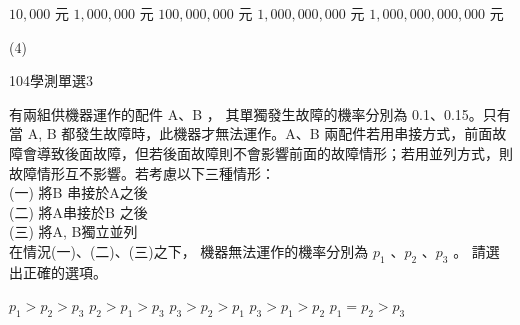 \begin{QUESTIONS}
\begin{QUESTION}
\begin{QBODY}
		\begin{QOPS}
			\QOP $10,000$ 元
			\QOP $1,000,000$ 元
			\QOP $100,000,000$ 元
			\QOP $1,000,000,000$ 元
			\QOP $1,000,000,000,000$ 元
		\end{QOPS}
        \end{QBODY}
        \begin{QFROMS}
        \end{QFROMS}
        \begin{QTAGS}\end{QTAGS}
        \begin{QANS}
            (4)
        \end{QANS}
        \begin{QSOLLIST}
        \end{QSOLLIST}
        \begin{QEMPTYSPACE}
        \end{QEMPTYSPACE}
    \end{QUESTION}
    \begin{QUESTION}
        \begin{ExamInfo}{104}{學測}{單選}{3}
        \end{ExamInfo}
        \begin{ExamAnsRateInfo}{57}{78}{60}{33}
        \end{ExamAnsRateInfo}
        \begin{QBODY}
			有兩組供機器運作的配件 A、B ， 其單獨發生故障的機率分別為 0.1、0.15。只有當 A, B 都發生故障時，此機器才無法運作。A、B 兩配件若用串接方式，前面故障會導致後面故障，但若後面故障則不會影響前面的故障情形；若用並列方式，則故障情形互不影響。若考慮以下三種情形：\\
			(一) 將B 串接於A之後\\
			(二) 將A串接於B 之後\\
			(三) 將A, B獨立並列\\
			在情況(一)、(二)、(三)之下， 機器無法運作的機率分別為 ${{p}_{1}}$ 、${{p}_{2}}$ 、${{p}_{3}}$ 。
			請選出正確的選項。
			\begin{QOPS}
				\QOP ${{p}_{1}}>{{p}_{2}}>{{p}_{3}}$
				\QOP ${{p}_{2}}>{{p}_{1}}>{{p}_{3}}$
				\QOP ${{p}_{3}}>{{p}_{2}}>{{p}_{1}}$
				\QOP ${{p}_{3}}>{{p}_{1}}>{{p}_{2}}$
				\QOP ${{p}_{1}}={{p}_{2}}>{{p}_{3}}$
			\end{QOPS}
        \end{QBODY}
        \begin{QFROMS}
        \end{QFROMS}
        \begin{QTAGS}\end{QTAGS}

\end{QUESTION}
\end{QUESTIONS}
